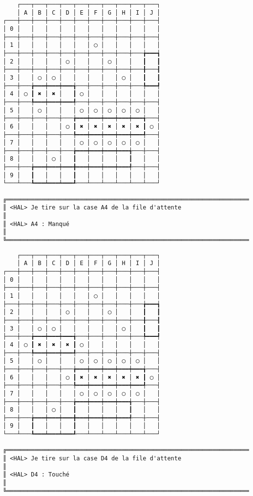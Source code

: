{\scriptsize
\begin{verbatim}
    ┌───┬───┬───┬───┬───┬───┬───┬───┬───┬───┐
    │ A │ B │ C │ D │ E │ F │ G │ H │ I │ J │
┌───┼───┼───┼───┼───┼───┼───┼───┼───┼───┼───┤
│ 0 │   │   │   │   │   │   │   │   │   │   │
├───┼───┼───┼───┼───┼───┼───┼───┼───┼───┼───┤
│ 1 │   │   │   │   │   │ ◯ │   │   │   │   │
├───┼───┼───┼───┼───┼───┼───┼───┼───┼───╆━━━┪
│ 2 │   │   │   │ ◯ │   │   │ ◯ │   │   ┃   ┃
├───┼───┼───┼───┼───┼───┼───┼───┼───┼───╂───┨
│ 3 │   │ ◯ │ ◯ │   │   │   │   │ ◯ │   ┃   ┃
├───┼───╆━━━┿━━━┿━━━╅───┼───┼───┼───┼───╄━━━┩
│ 4 │ ◯ ┃ ✖ │ ✖ │   ┃ ◯ │   │   │   │   │   │
├───┼───╄━━━┿━━━┿━━━╃───┼───┼───┼───┼───┼───┤
│ 5 │   │ ◯ │   │   │ ◯ │ ◯ │ ◯ │ ◯ │ ◯ │   │
├───┼───┼───┼───┼───╆━━━┿━━━┿━━━┿━━━┿━━━╅───┤
│ 6 │   │   │   │ ◯ ┃ ✖ │ ✖ │ ✖ │ ✖ │ ✖ ┃ ◯ │
├───┼───┼───┼───┼───╄━━━┿━━━┿━━━┿━━━┿━━━╃───┤
│ 7 │   │   │   │   │ ◯ │ ◯ │ ◯ │ ◯ │ ◯ │   │
├───┼───┼───┼───┼───╆━━━┿━━━┿━━━┿━━━╅───┼───┤
│ 8 │   │   │ ◯ │   ┃   │   │   │   ┃   │   │
├───┼───╆━━━┿━━━┿━━━╋━━━┿━━━┿━━━┿━━━╃───┼───┤
│ 9 │   ┃   │   │   ┃   │   │   │   │   │   │
└───┴───┺━━━┷━━━┷━━━┹───┴───┴───┴───┴───┴───┘

╔══════════════════════════════════════════════════════════════════════════════════════════════════╗
║ <HAL> Je tire sur la case A4 de la file d'attente                                                ║
║ <HAL> A4 : Manqué                                                                                ║
╚══════════════════════════════════════════════════════════════════════════════════════════════════╝
\end{verbatim}}
\newpage

{\scriptsize
\begin{verbatim}
    ┌───┬───┬───┬───┬───┬───┬───┬───┬───┬───┐
    │ A │ B │ C │ D │ E │ F │ G │ H │ I │ J │
┌───┼───┼───┼───┼───┼───┼───┼───┼───┼───┼───┤
│ 0 │   │   │   │   │   │   │   │   │   │   │
├───┼───┼───┼───┼───┼───┼───┼───┼───┼───┼───┤
│ 1 │   │   │   │   │   │ ◯ │   │   │   │   │
├───┼───┼───┼───┼───┼───┼───┼───┼───┼───╆━━━┪
│ 2 │   │   │   │ ◯ │   │   │ ◯ │   │   ┃   ┃
├───┼───┼───┼───┼───┼───┼───┼───┼───┼───╂───┨
│ 3 │   │ ◯ │ ◯ │   │   │   │   │ ◯ │   ┃   ┃
├───┼───╆━━━┿━━━┿━━━╅───┼───┼───┼───┼───╄━━━┩
│ 4 │ ◯ ┃ ✖ │ ✖ │ ✖ ┃ ◯ │   │   │   │   │   │
├───┼───╄━━━┿━━━┿━━━╃───┼───┼───┼───┼───┼───┤
│ 5 │   │ ◯ │   │   │ ◯ │ ◯ │ ◯ │ ◯ │ ◯ │   │
├───┼───┼───┼───┼───╆━━━┿━━━┿━━━┿━━━┿━━━╅───┤
│ 6 │   │   │   │ ◯ ┃ ✖ │ ✖ │ ✖ │ ✖ │ ✖ ┃ ◯ │
├───┼───┼───┼───┼───╄━━━┿━━━┿━━━┿━━━┿━━━╃───┤
│ 7 │   │   │   │   │ ◯ │ ◯ │ ◯ │ ◯ │ ◯ │   │
├───┼───┼───┼───┼───╆━━━┿━━━┿━━━┿━━━╅───┼───┤
│ 8 │   │   │ ◯ │   ┃   │   │   │   ┃   │   │
├───┼───╆━━━┿━━━┿━━━╋━━━┿━━━┿━━━┿━━━╃───┼───┤
│ 9 │   ┃   │   │   ┃   │   │   │   │   │   │
└───┴───┺━━━┷━━━┷━━━┹───┴───┴───┴───┴───┴───┘

╔══════════════════════════════════════════════════════════════════════════════════════════════════╗
║ <HAL> Je tire sur la case D4 de la file d'attente                                                ║
║ <HAL> D4 : Touché                                                                                ║
╚══════════════════════════════════════════════════════════════════════════════════════════════════╝
\end{verbatim}}
\newpage

